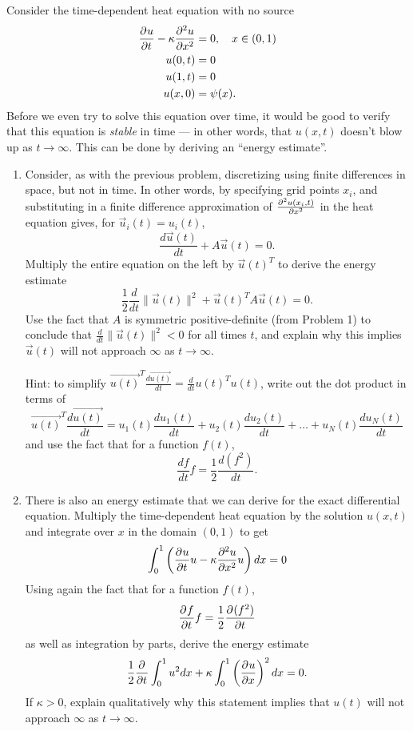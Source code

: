 Consider the time-dependent heat equation with no source
\begin{align*}
\frac{\partial^{} u}{\partial t^{}}-\kappa\frac{\partial^{2} u}{\partial x^{2}} &= 0, \quad x\in (0,1)\\
u(0,t) &= 0\\
u(1,t) &= 0\\
u(x,0) &= \psi(x).
\end{align*}
Before we even try to solve this equation over time, it would be good to verify that this equation is \textit{stable} in time --- in other words, that $u(x,t)$ doesn't blow up as $t\rightarrow \infty$.  This can be done by deriving an ``energy estimate''.
\begin{enumerate}
\item Consider, as with the previous problem, discretizing using finite differences in space, but not in time.  In other words, by specifying grid points $x_i$, and substituting in a finite difference approximation of $\frac{\partial^{2} u(x_i,t)}{\partial x^{2}}$  in the  heat equation gives, for $\vec{u}_i(t) = u_i(t)$,
\[
\frac{d \vec{u}(t)}{dt} + A\vec{u}(t) = 0.
\]
Multiply the entire equation on the left by $\vec{u}(t)^T$ to derive the energy estimate
\[
\frac{1}{2}\frac{d}{dt} \|\vec{u}(t)\|^2 + \vec{u}(t)^T A \vec{u}(t) = 0.
\]
Use the fact that $A$ is symmetric positive-definite (from Problem 1) to conclude that $\frac{d}{dt} \|\vec{u}(t)\|^2 < 0$ for all times $t$, and explain why this implies $\vec{u}(t)$  will not approach $\infty$ as $t\rightarrow \infty$.  

\vspace{1em}

Hint: to simplify $\vec{u(t)}^T\frac{d\vec{u(t)}}{dt} = \frac{d}{dt} u(t)^Tu(t)$, write out the dot product in terms of 
\[
\vec{u(t)}^T\frac{d\vec{u(t)}}{dt} = u_1(t) \frac{du_1(t)}{dt} + u_2(t) \frac{du_2(t)}{dt} + \ldots + u_N(t) \frac{du_N(t)}{dt}
\]
and use the fact that for a function $f(t)$, 
\[
\frac{df}{dt}{}f = \frac{1}{2}\frac{d(f^2)}{dt}.
\]

\item There is also an energy estimate that we can derive for the exact differential equation.  Multiply the time-dependent heat equation by the solution $u(x,t)$ and integrate over $x$ in the domain $(0,1)$ to get
\[
\int_0^1 \left(\frac{\partial^{} u}{\partial t^{}}u - \kappa\frac{\partial^{2} u}{\partial x^{2}}u\right) dx= 0
\]
Using again the fact that for a function $f(t)$, 
\[
\frac{\partial^{} f}{\partial t^{}}f = \frac{1}{2}\frac{\partial^{} (f^2)}{\partial t^{}}
\]
as well as integration by parts, derive the energy estimate
\[
\frac{1}{2}\frac{\partial^{} }{\partial t^{}} \int_0^1 u^2 dx+ \kappa \int_0^1 \left(\frac{\partial^{} u}{\partial x^{}}\right)^2 dx = 0.
\]
If $\kappa > 0$, explain qualitatively why this statement implies that $u(t)$ will not approach $\infty$ as $t\rightarrow \infty$.  


\end{enumerate}
